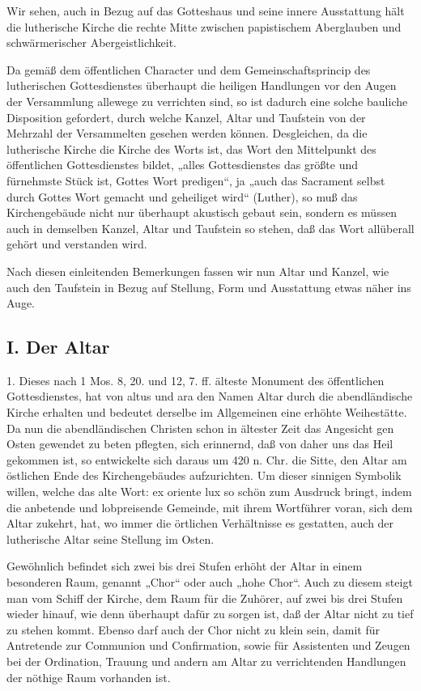 Wir sehen, auch in Bezug auf das Gotteshaus und seine innere Ausstattung hält die lutherische Kirche die rechte Mitte zwischen papistischem Aberglauben und schwärmerischer Abergeistlichkeit.

Da gemäß dem öffentlichen Character und dem Gemeinschaftsprincip des lutherischen Gottesdienstes überhaupt die heiligen Handlungen vor den Augen der Versammlung allewege zu verrichten sind, so ist dadurch eine solche bauliche Disposition gefordert, durch welche Kanzel, Altar und Taufstein von der Mehrzahl der Versammelten gesehen werden können. Desgleichen, da die lutherische Kirche die Kirche des Worts ist, das Wort den Mittelpunkt des öffentlichen Gottesdienstes bildet, „alles Gottesdienstes das größte und fürnehmste Stück ist, Gottes Wort predigen“, ja „auch das Sacrament selbst durch Gottes Wort gemacht und geheiliget wird“ (Luther), so muß das Kirchengebäude nicht nur überhaupt akustisch gebaut sein, sondern es müssen auch in demselben Kanzel, Altar und Taufstein so stehen, daß das Wort allüberall gehört und verstanden wird.

Nach diesen einleitenden Bemerkungen fassen wir nun Altar und Kanzel, wie auch den Taufstein in Bezug auf Stellung, Form und Ausstattung etwas näher ins Auge.

\subsection{I. Der Altar}

1. Dieses nach 1 Mos. 8, 20. und 12, 7. ff. älteste Monument des öffentlichen Gottesdienstes, hat von altus und ara den Namen Altar durch die abendländische Kirche erhalten und bedeutet derselbe im Allgemeinen eine erhöhte Weihestätte. Da nun die abendländischen Christen schon in ältester Zeit das Angesicht gen Osten gewendet zu beten pflegten, sich erinnernd, daß von daher uns das Heil gekommen ist, so entwickelte sich daraus um 420 n. Chr. die Sitte, den Altar am östlichen Ende des Kirchengebäudes aufzurichten. Um dieser sinnigen Symbolik willen, welche das alte Wort: ex oriente lux so schön zum Ausdruck bringt, indem die anbetende und lobpreisende Gemeinde, mit ihrem Wortführer voran, sich dem Altar zukehrt, hat, wo immer die örtlichen Verhältnisse es gestatten, auch der lutherische Altar seine Stellung im Osten.

Gewöhnlich befindet sich zwei bis drei Stufen erhöht der Altar in einem besonderen Raum, genannt „Chor“ oder auch „hohe Chor“. Auch zu diesem steigt man vom Schiff der Kirche, dem Raum für die Zuhörer, auf zwei bis drei Stufen wieder hinauf, wie denn überhaupt dafür zu sorgen ist, daß der Altar
nicht zu tief zu stehen kommt. Ebenso darf auch der Chor nicht zu klein sein, damit für Antretende zur Communion und Confirmation, sowie für Assistenten und Zeugen bei der Ordination, Trauung und andern am Altar zu verrichtenden Handlungen der nöthige Raum vorhanden ist.

